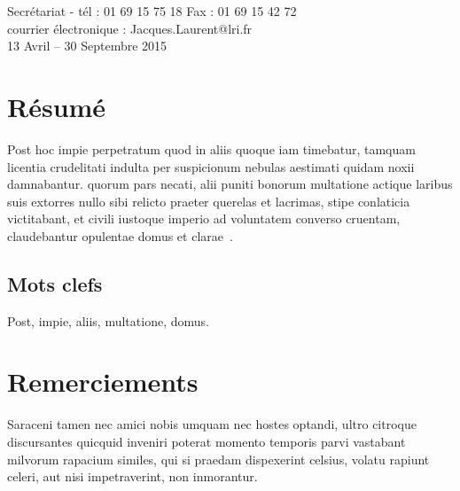 \documentclass[oneside]{memoir}
\begin{document}
\begin{titlingpage}
\begin{center}
 
\vfill


 
{Secrétariat - tél : 01 69 15 75 18  Fax : 01 69 15 42 72\\
courrier électronique : Jacques.Laurent@lri.fr\\
\large 13 Avril -- 30 Septembre 2015}
 
\end{center}
 
\end{titlingpage}



\tableofcontents

\newpage
\thispagestyle{empty}%
\newpage

\chapter*{Résumé}

Post hoc impie perpetratum quod in aliis quoque iam timebatur, tamquam
licentia crudelitati indulta per suspicionum nebulas aestimati quidam
noxii damnabantur. quorum pars necati, alii puniti bonorum multatione
actique laribus suis extorres nullo sibi relicto praeter querelas et
lacrimas, stipe conlaticia victitabant, et civili iustoque imperio ad
voluntatem converso cruentam, claudebantur opulentae domus et
clarae~\cite{ammianius42}.

\section*{Mots clefs}
Post, impie, aliis, multatione, domus.

\pagebreak

\setcounter{page}{1}





\chapter*{Remerciements}
Saraceni tamen nec amici nobis umquam nec hostes optandi, ultro
citroque discursantes quicquid inveniri poterat momento temporis parvi
vastabant milvorum rapacium similes, qui si praedam dispexerint
celsius, volatu rapiunt celeri, aut nisi impetraverint, non
inmorantur.




\appendix

% 
\end{document}
